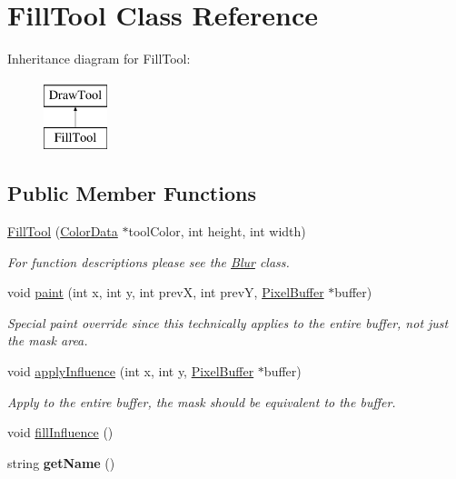 \hypertarget{classFillTool}{\section{Fill\-Tool Class Reference}
\label{classFillTool}
}
Inheritance diagram for Fill\-Tool\-:\begin{figure}[H]
\begin{center}
\leavevmode
\includegraphics[height=2.000000cm]{classFillTool}
\end{center}
\end{figure}
\subsection*{Public Member Functions}
\begin{DoxyCompactItemize}
\item 
\hyperlink{classFillTool_a6abe3f5032f5e69a11cf38b94da90a62}{Fill\-Tool} (\hyperlink{classColorData}{Color\-Data} $\ast$tool\-Color, int height, int width)
\begin{DoxyCompactList}\small\item\em For function descriptions please see the \hyperlink{classBlur}{Blur} class. \end{DoxyCompactList}\item 
\hypertarget{classFillTool_a81a3a46e5600d6250634766e8b769796}{void \hyperlink{classFillTool_a81a3a46e5600d6250634766e8b769796}{paint} (int x, int y, int prev\-X, int prev\-Y, \hyperlink{classPixelBuffer}{Pixel\-Buffer} $\ast$buffer)}\label{classFillTool_a81a3a46e5600d6250634766e8b769796}

\begin{DoxyCompactList}\small\item\em Special paint override since this technically applies to the entire buffer, not just the mask area. \end{DoxyCompactList}\item 
\hypertarget{classFillTool_a8ad4d0d5b2a5379be3720c89a102ddb3}{void \hyperlink{classFillTool_a8ad4d0d5b2a5379be3720c89a102ddb3}{apply\-Influence} (int x, int y, \hyperlink{classPixelBuffer}{Pixel\-Buffer} $\ast$buffer)}\label{classFillTool_a8ad4d0d5b2a5379be3720c89a102ddb3}

\begin{DoxyCompactList}\small\item\em Apply to the entire buffer, the mask should be equivalent to the buffer. \end{DoxyCompactList}\item 
void \hyperlink{classFillTool_a888fd877cf0937e9b36be2d56f06de3e}{fill\-Influence} ()
\item 
\hypertarget{classFillTool_a7466c932b389d32e4a200763ccb087be}{string {\bfseries get\-Name} ()}\label{classFillTool_a7466c932b389d32e4a200763ccb087be}

\end{DoxyCompactItemize}
